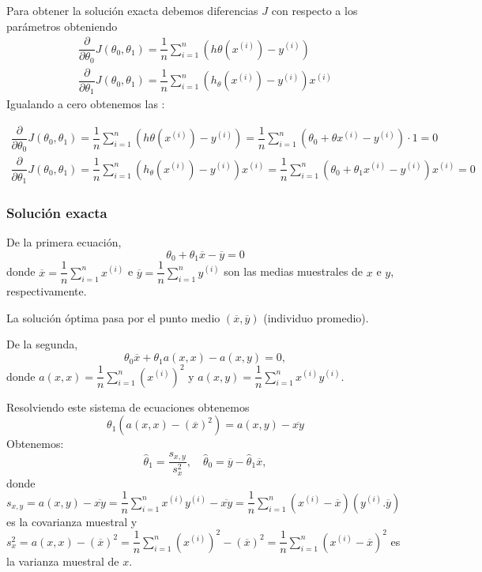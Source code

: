 Para obtener la solución exacta debemos diferencias $J$ con respecto a los parámetros obteniendo \[ \begin{array}{l}
	\dfrac{\partial}{\partial \theta_0}J(\theta_0,\theta_1)=\dfrac{1}{n}\sum_{i=1}^{n}\left(h\theta\left(x^{(i)}\right)-y^{(i)}\right)\\
	\dfrac{\partial}{\partial\theta_1}J(\theta_0,\theta_1)=\dfrac{1}{n}\sum_{i=1}^{n}\left(h_\theta\left(x^{(i)}\right)-y^{(i)}\right)x^{(i)}
\end{array} \]
Igualando a cero obtenemos las :

$\begin{array}{l}
	\dfrac{\partial}{\partial \theta_0}J(\theta_0,\theta_1)=\dfrac{1}{n}\sum_{i=1}^{n}\left(h\theta\left(x^{(i)}\right)-y^{(i)}\right)=\dfrac{1}{n}\sum_{i=1}^{n}\left(\theta_0+\theta x^{(i)}-y^{(i)}\right)\cdot1=0\\
	\dfrac{\partial}{\partial\theta_1}J(\theta_0,\theta_1)=\dfrac{1}{n}\sum_{i=1}^{n}\left(h_\theta\left(x^{(i)}\right)-y^{(i)}\right)x^{(i)}=\dfrac{1}{n}\sum_{i=1}^{n}\left(\theta_0+\theta_1x^{(i)}-y^{(i)}\right)x^{(i)}=0
\end{array}$
\subsubsection{Solución exacta}
De la primera ecuación, \[ \theta_0+\theta_1\overline{x}-\overline{y}=0 \]donde $\overline{x}=\dfrac{1}{n}\sum_{i=1}^{n}x^{(i)}$ e $\overline{y}=\dfrac{1}{n}\sum_{i=1}^{n}y^{(i)}$ son las medias muestrales de $x$ e $y$, respectivamente.

La solución óptima pasa por el punto medio $(\overline{x},\overline{y})$ (individuo promedio).

De la segunda, \[ \theta_0\overline{x}+\theta_1a(x,x)-a(x,y)=0,\] donde $a(x,x)=\dfrac{1}{n}\sum_{i=1}^{n}\left(x^{(i)}\right)^2$ y $a(x,y)=\dfrac{1}{n}\sum_{i=1}^{n}x^{(i)}y^{(i)}$.

Resolviendo este sistema de ecuaciones obtenemos \[ \theta_1\left(a(x,x)-(\overline{x})^2\right)=a(x,y)-\overline{xy} \]
Obtenemos: \[ \hat{\theta}_1=\dfrac{s_{x,y}}{s_x^2},\quad \hat{\theta}_0=\overline{y}-\hat{\theta}_1\overline{x}, \] donde $s_{x,y}=a(x,y)-\overline{xy}=\dfrac{1}{n}\sum_{i=1}^{n}x^{(i)}y^{(i)}-\overline{xy}=\dfrac{1}{n}\sum_{i=1}^{n}\left(x^{(i)}-\overline{x}\right)\left(y^{(i)}.\overline{y}\right)$ es la covarianza muestral y $s_x^2=a(x,x)-(\overline{x})^2=\dfrac{1}{n}\sum_{i=1}^{n}\left(x^{(i)}\right)^2-(\overline{x})^2=\dfrac{1}{n}\sum_{i=1}^{n}\left(x^{(i)}-\overline{x}\right)^2$ es la varianza muestral de $x$.

